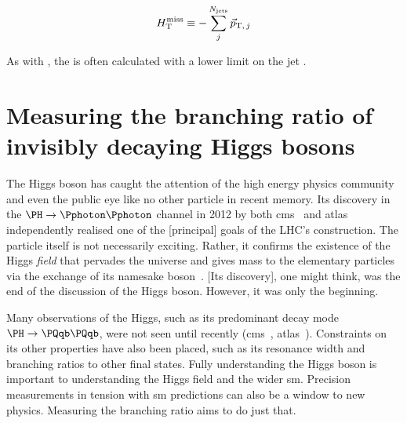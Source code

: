 \begin{equation}
    H_{\mathrm{T}}^{\text{miss}} \equiv - \sum_j^{N_{\mathrm{jets}}} {\vec p}_{\mathrm{T}, \, j}
    \label{eq:mht_definition}
\end{equation}

As with \HT, the \mht is often calculated with a lower limit on the jet \pt.





\section{Measuring the branching ratio of invisibly decaying Higgs bosons}
\label{sec:theory_higgs_to_inv}

The Higgs boson has caught the attention of the high energy physics community and even the public eye like no other particle in recent memory. Its discovery in the $\PH \rightarrow \Pphoton\Pphoton$ channel in 2012 by both \acrshort{cms}~\cite{Chatrchyan:2012xdj} and \acrshort{atlas}~\cite{Aad:2012tfa} independently realised one of the [principal] goals of the LHC's construction. The particle itself is not necessarily exciting. Rather, it confirms the existence of the Higgs \emph{field} that pervades the universe and gives mass to the elementary particles via the exchange of its namesake boson~\cite{PhysRevLett.13.321,PhysRevLett.13.508,PhysRevLett.13.585}. [Its discovery], one might think, was the end of the discussion of the Higgs boson. However, it was only the beginning.

Many observations of the Higgs, such as its predominant decay mode $\PH \rightarrow \Pqb\Pqb$, were not seen until recently (\acrshort{cms}~\cite{Sirunyan:2018kst}, \acrshort{atlas}~\cite{Aaboud:2018zhk}). Constraints on its other properties have also been placed, such as its resonance width and branching ratios \BR to other final states. Fully understanding the Higgs boson is important to understanding the Higgs field and the wider \acrlong{sm}. Precision measurements in tension with \acrshort{sm} predictions can also be a window to new physics. Measuring the \higgstoinv branching ratio aims to do just that.

